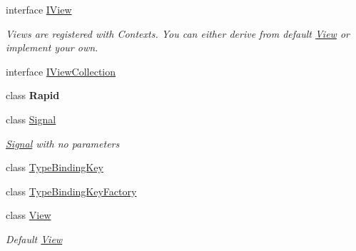 \begin{DoxyCompactItemize}
interface \mbox{\hyperlink{interfacecp_games_1_1core_1_1_rapid_m_v_c_1_1_i_view}{I\+View}}
\begin{DoxyCompactList}\small\item\em Views are registered with Contexts. You can either derive from default \mbox{\hyperlink{classcp_games_1_1core_1_1_rapid_m_v_c_1_1_view}{View}} or implement your own. \end{DoxyCompactList}\item 
interface \mbox{\hyperlink{interfacecp_games_1_1core_1_1_rapid_m_v_c_1_1_i_view_collection}{I\+View\+Collection}}
\item 
class {\bfseries Rapid}
\item 
class \mbox{\hyperlink{classcp_games_1_1core_1_1_rapid_m_v_c_1_1_signal}{Signal}}
\begin{DoxyCompactList}\small\item\em \mbox{\hyperlink{classcp_games_1_1core_1_1_rapid_m_v_c_1_1_signal}{Signal}} with no parameters \end{DoxyCompactList}\item 
class \mbox{\hyperlink{classcp_games_1_1core_1_1_rapid_m_v_c_1_1_type_binding_key}{Type\+Binding\+Key}}
\item 
class \mbox{\hyperlink{classcp_games_1_1core_1_1_rapid_m_v_c_1_1_type_binding_key_factory}{Type\+Binding\+Key\+Factory}}
\item 
class \mbox{\hyperlink{classcp_games_1_1core_1_1_rapid_m_v_c_1_1_view}{View}}
\begin{DoxyCompactList}\small\item\em Default \mbox{\hyperlink{classcp_games_1_1core_1_1_rapid_m_v_c_1_1_view}{View}} \end{DoxyCompactList}\end{DoxyCompactItemize}
